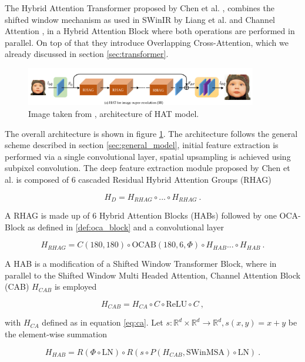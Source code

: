 The Hybrid Attention Transformer proposed by Chen et al. \cite{chenHATHybridAttention2024},
combines the shifted window mechanism as used in SWinIR by Liang et al. \cite{liangSwinIRImageRestoration2021a}
and Channel Attention \cite{zhangImageSuperResolutionUsing2018},
in a Hybrid Attention Block where both operations are performed in parallel.
On top of that they introduce Overlapping Cross-Attention, which we already discussed in section \ref{sec:transformer}.

\begin{figure}[h!]
    \includegraphics[width=0.9\textwidth]{models/sisr/imgs/hat.png}
    \caption{Image taken from \cite{chenHATHybridAttention2024}, architecture of HAT model.}
    \label{fig:hat_model}
\end{figure}

The overall architecture is shown in figure \ref{fig:hat_model}.
The architecture follows the general scheme described in section \ref{sec:general_model},
initial feature extraction is performed via a single convolutional layer,
spatial upsampling is achieved using subpixel convolution.
The deep feature extraction module proposed by Chen et al. \cite{chenHATHybridAttention2024}
is composed of $6$ cascaded Residual Hybrid Attention Groups (RHAG)

    $$ H_D = H_{RHAG} \circ ... \circ H_{RHAG} ~. $$

A RHAG is made up of $6$ Hybrid Attention Blocks (HABs) followed by one OCA-Block as defined in \ref{def:oca_block} 
and a convolutional layer

    $$ H_{RHAG} = C(180, 180) \circ \text{OCAB}(180, 6, \Phi) \circ H_{HAB} ... \circ H_{HAB}  ~. $$

A HAB is a modification of a Shifted Window Transformer Block, 
where in parallel to the Shifted Window Multi Headed Attention,
Channel Attention Block (CAB) $H_{CAB}$ is employed

    $$ H_{CAB} = H_{CA} \circ C \circ \text{ReLU} \circ C ~, $$

with $H_{CA}$ defined as in equation \ref{eq:ca}.
Let $s: \mathbb R^{d} \times \mathbb R^{d} \to \mathbb R^d, s(x,y) = x + y$ be the element-wise summation

    $$H_{HAB} = R( \Phi \circ \text{LN} ) \circ R( s \circ P(H_{CAB}, \text{SWinMSA}) \circ \text{LN} ) ~. $$

